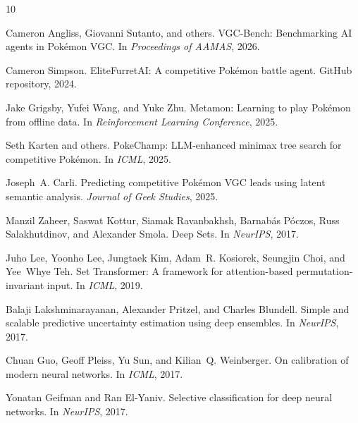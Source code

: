 \documentclass[11pt]{article}
\begin{document}

\begin{thebibliography}{10}

Cameron Angliss, Giovanni Sutanto, and others.
\newblock VGC-Bench: Benchmarking AI agents in Pok\'emon VGC.
\newblock In \emph{Proceedings of AAMAS}, 2026.

Cameron Simpson.
\newblock EliteFurretAI: A competitive Pok\'emon battle agent.
\newblock GitHub repository, 2024.

Jake Grigsby, Yufei Wang, and Yuke Zhu.
\newblock Metamon: Learning to play Pok\'emon from offline data.
\newblock In \emph{Reinforcement Learning Conference}, 2025.

Seth Karten and others.
\newblock PokeChamp: LLM-enhanced minimax tree search for competitive Pok\'emon.
\newblock In \emph{ICML}, 2025.

Joseph~A. Carli.
\newblock Predicting competitive Pok\'emon VGC leads using latent semantic analysis.
\newblock \emph{Journal of Geek Studies}, 2025.

Manzil Zaheer, Saswat Kottur, Siamak Ravanbakhsh, Barnab{\'a}s P{\'o}czos, Russ Salakhutdinov, and Alexander Smola.
\newblock Deep Sets.
\newblock In \emph{NeurIPS}, 2017.

Juho Lee, Yoonho Lee, Jungtaek Kim, Adam~R. Kosiorek, Seungjin Choi, and Yee~Whye Teh.
\newblock Set Transformer: A framework for attention-based permutation-invariant input.
\newblock In \emph{ICML}, 2019.

Balaji Lakshminarayanan, Alexander Pritzel, and Charles Blundell.
\newblock Simple and scalable predictive uncertainty estimation using deep ensembles.
\newblock In \emph{NeurIPS}, 2017.

Chuan Guo, Geoff Pleiss, Yu Sun, and Kilian~Q. Weinberger.
\newblock On calibration of modern neural networks.
\newblock In \emph{ICML}, 2017.

Yonatan Geifman and Ran El-Yaniv.
\newblock Selective classification for deep neural networks.
\newblock In \emph{NeurIPS}, 2017.

\end{thebibliography}
\end{document}
